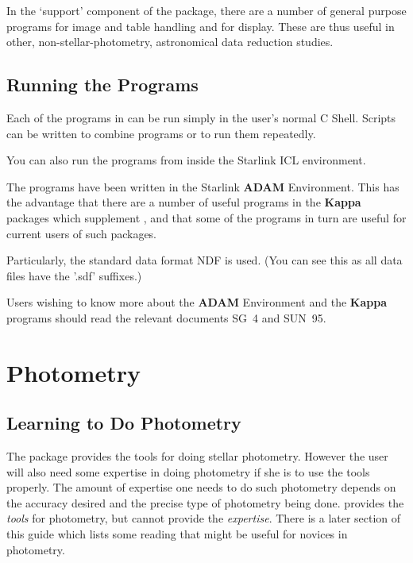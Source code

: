 In the `support' component of the \starman package, there are a number of
general purpose programs for image and table handling and for display.
These are thus useful in other, non-stellar-photometry, astronomical data
reduction studies.

\subsection{Running the Programs }

Each of the programs in \starman can be run simply in the user's
normal C Shell. Scripts can be written to combine programs or to
run them repeatedly.

You can also run the programs from inside the Starlink ICL environment.

The programs have been written in the Starlink {\bf ADAM} Environment. This
has the advantage that there are a number of useful programs in the {\bf
Kappa} packages which supplement \starman, and that some of the \starman
programs in turn are useful for current users of such packages.

Particularly, the standard data format NDF is used. (You can see
this as all data files have the '.sdf' suffixes.)

Users wishing to know more about the {\bf ADAM} Environment and the
{\bf Kappa} programs should read the relevant documents
SG~4 and SUN~95.













\section { Photometry}


\subsection{Learning to Do Photometry}

The \starman package provides the tools for doing stellar photometry.
However the user will also need some expertise in doing photometry if she is
to use the tools properly. The amount of expertise one needs to do such
photometry depends on the accuracy desired and the precise type of
photometry being done. \starman provides the {\it tools\/} for photometry,
but cannot provide the {\it expertise}. There is a later section of this
guide which lists some reading that might be useful for novices in
photometry.

